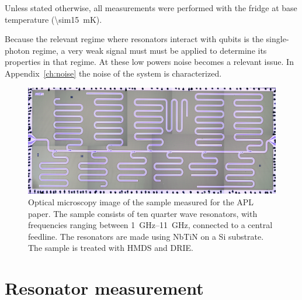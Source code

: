     Unless stated otherwise, all measurements were performed with the fridge at base temperature (\SI{\sim15}{\milli \kelvin}).

    Because the relevant regime where resonators interact with qubits is the single-photon regime, a very weak signal must must be applied to determine its properties in that regime. At these low powers noise becomes a relevant issue. In Appendix~\ref{ch:noise} the noise of the system is characterized.

    \begin{figure}[h]
      \centering
      \includegraphics[width=.7\textwidth]{Figures/DRIE/All_set4.png}
      \caption{Optical microscopy image of the sample measured for the APL paper. The sample consists of ten quarter wave resonators, with frequencies ranging between \SIrange{1}{11}{\giga \hertz}, connected to a central feedline. The resonators are made using NbTiN on a Si substrate. The sample is treated with HMDS and DRIE.}
        \label{fig:set4}
    \end{figure}



\section{Resonator measurement}


